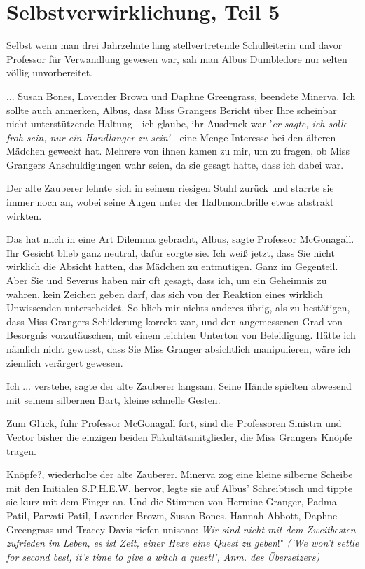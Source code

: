 \chapter{Selbstverwirklichung, Teil 5}

Selbst wenn man drei Jahrzehnte lang stellvertretende Schulleiterin und davor
Professor für Verwandlung gewesen war, sah man Albus Dumbledore nur selten
völlig unvorbereitet.

\glqq ... Susan Bones, Lavender Brown und Daphne Greengrass\grqq{}, beendete
Minerva. \glqq Ich sollte auch anmerken, Albus, dass Miss Grangers Bericht über
Ihre scheinbar nicht unterstützende Haltung - ich glaube, ihr Ausdruck war
'\emph{er sagte, ich solle froh sein, nur ein Handlanger zu sein'} - eine Menge
Interesse bei den älteren Mädchen geweckt hat. Mehrere von ihnen kamen zu mir,
um zu fragen, ob Miss Grangers Anschuldigungen wahr seien, da sie gesagt hatte,
dass ich dabei war.\grqq{}

Der alte Zauberer lehnte sich in seinem riesigen Stuhl zurück und starrte sie
immer noch an, wobei seine Augen unter der Halbmondbrille etwas abstrakt
wirkten.

\glqq Das hat mich in eine Art Dilemma gebracht, Albus\grqq{}, sagte Professor
McGonagall. Ihr Gesicht blieb ganz neutral, dafür sorgte sie. \glqq Ich weiß
jetzt, dass Sie nicht wirklich die Absicht hatten, das Mädchen zu entmutigen.
Ganz im Gegenteil. Aber Sie und Severus haben mir oft gesagt, dass ich, um ein
Geheimnis zu wahren, kein Zeichen geben darf, das sich von der Reaktion eines
wirklich Unwissenden unterscheidet. So blieb mir nichts anderes übrig, als zu
bestätigen, dass Miss Grangers Schilderung korrekt war, und den angemessenen
Grad von Besorgnis vorzutäuschen, mit einem leichten Unterton von Beleidigung.
Hätte ich nämlich nicht gewusst, dass Sie Miss Granger absichtlich manipulieren,
wäre ich ziemlich verärgert gewesen.\grqq{}

\glqq Ich ... verstehe\grqq{}, sagte der alte Zauberer langsam. Seine Hände
spielten abwesend mit seinem silbernen Bart, kleine schnelle Gesten.

\glqq Zum Glück\grqq{}, fuhr Professor McGonagall fort, \glqq sind die
Professoren Sinistra und Vector bisher die einzigen beiden Fakultätsmitglieder,
die Miss Grangers Knöpfe tragen.\grqq{}

\glqq Knöpfe?\grqq{}, wiederholte der alte Zauberer. Minerva zog eine kleine
silberne Scheibe mit den Initialen S.P.H.E.W. hervor, legte sie auf Albus'
Schreibtisch und tippte sie kurz mit dem Finger an. Und die Stimmen von Hermine
Granger, Padma Patil, Parvati Patil, Lavender Brown, Susan Bones, Hannah Abbott,
Daphne Greengrass und Tracey Davis riefen unisono: \glqq \emph{Wir sind nicht
mit dem Zweitbesten zufrieden im Leben, es ist Zeit, einer Hexe eine Quest zu
geben}!"
\emph{('We won't settle for second best, it's time to give a witch a quest!', Anm. des Übersetzers)}

